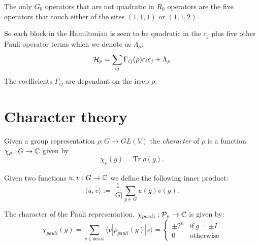 \documentclass[12pt,notitlepage,longbibliography,nofootinbib,tightenlines]{revtex4}
\begin{document}
The only $G_0$ operators that are not 
quadratic in $R_0$ operators are the five
operators that touch either of the sites
$(1,1,1)$ or $(1,1,2)$.

So each block in the Hamiltonian
is seen to be quadratic in the $c_j$ plus
five other Pauli operator terms which we denote as $\Lambda_\rho$:
$$
    \mathcal{H}_\rho = \sum_{ij} \Gamma_{ij}(\rho) c_i c_j + \Lambda_\rho
$$
The coefficients $\Gamma_{ij}$ are dependant on the irrep $\rho.$


%
%

%


%
%

\appendix
\section{Character theory}
\label{appendix}

Given a group representation $\rho:G\to GL(V)$
the {\it character} of $\rho$ is a function
$\chi_\rho:G\to \mathbb{C}$ given by
$$
    \chi_\rho(g) = \mbox{Tr}\ \rho(g).
$$

Given two functions $u,v : G \to \mathbb{C}$ 
we define the following inner product:
$$
    \langle u, v \rangle := \frac{1}{|G|} \sum_{g\in G} u(g) \overline{v(g)}.
$$

The character of the Pauli representation, $\chi_{{pauli}}:\mathcal{P}_n\to\mathbb{C}$
is given by:
$$
\chi_{{pauli}}(g) = \sum_{v \in basis} \langle v | \rho_{{pauli}}(g) | v \rangle
    = \left\{ \begin{array}{ll}
 \pm 2^n &\mbox{if}\ g=\pm I\\
 0 &\mbox{otherwise}\end{array}\right.
$$
\end{document}

